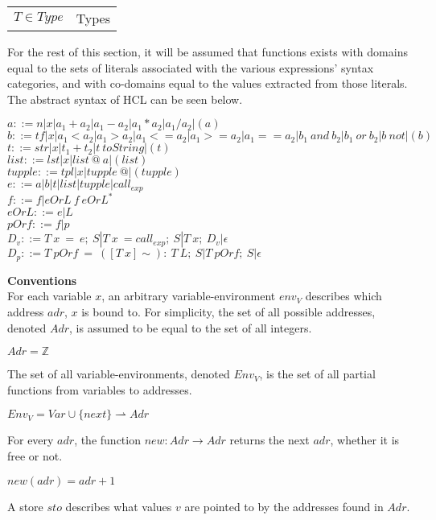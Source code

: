 {\begin{center}
\begin{table}[ht]
\begin{tabular}{ll}
			$T \in Type$          & Types
		\end{tabular}
	\end{table}
\end{center}

For the rest of this section, it will be assumed that functions exists with domains equal to the sets of literals associated with the various expressions' syntax categories, and with co-domains equal to the values extracted from those literals.
The abstract syntax of HCL can be seen below.

$a ::= n | x | a_1+a_2 | a_1-a_2 | a_1*a_2 | a_1/a_2 | (a)$\\
$b ::= tf| x | a_1<a_2 | a_1>a_2 | a_1<=a_2| a_1>=a_2| a_1==a_2 | b_1\ and\ b_2 | b_1\ or\ b_2 | b\ not | (b)$\\
$t ::= str| x | t_1 + t_2 | t\ toString | (t)$\\
$list ::= lst | x | list\ @\ a | (list)$\\
$tupple ::= tpl | x | tupple\ @ | (tupple)$\\
$e ::= a | b | t | list | tupple | call_{exp}$\\
$f ::= f | eOrL\ f\ eOrL^*$\\
$eOrL ::= e | L$\\
$pOrf ::= f | p$\\
$D_v ::= T\ x\ =\ e;\ S | T\ x\ = call_{exp};\ S | T\ x;\ D_v | \epsilon$\\
$D_p ::= T\ pOrf\ =\ ([T\ x]\sim):\ T\ L;\ S |T\ pOrf;\ S | \epsilon$

\textbf{\large{Conventions}} \\
For each variable $x$, an arbitrary variable-environment $env_V$ describes which address $adr$, $x$ is bound to.
For simplicity, the set of all possible addresses, denoted $Adr$, is assumed to be equal to the set of all integers.
\begin{center}
	$Adr = \mathbb{Z}$
\end{center}
The set of all variable-environments, denoted \textbf{$Env_V$}, is the set of all partial functions from variables to addresses.
\begin{center}
	$Env_V = Var \cup \{next\} \rightharpoonup Adr$
\end{center}
For every $adr$, the function $new : Adr \rightarrow Adr$ returns the next $adr$, whether it is free or not.
\begin{center}
	$new (adr) = adr + 1$
\end{center}
A store $sto$ describes what values $v$ are pointed to by the addresses found in $Adr$.

}
